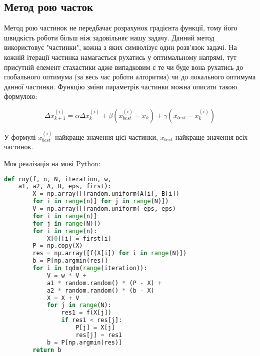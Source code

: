 \subsection{Метод рою часток}


Метод рою частинок не передбачає розрахунок градієнта функції, тому його 
швидкість роботи більш ніж задовільняє нашу задачу.
Данний метод використовує "частинки", кожна з яких символізує один
розв'язок задачі. На кожній ітерації частинка намагається рухатись у 
оптимальному напрямі, тут присутній елемент стахастики адже випадковим є те 
чи буде вона рухатись до глобального оптимума (за весь час 
роботи алгоритма) чи до локального оптимума данної частинки. 
Функцію зміни параметрів частинки можна описати такою формулою: 

$$\Delta x_{k + 1}^{(i)} = \alpha \Delta x_k^{(i)} + 
\beta (x_{best}^{(i)} - x_k) + \gamma(x_{best} - x_k^{(i)})$$


У формулі $x_{best}^{(i)}$ найкраще значення цієї частинки, 
$x_{best}$ найкраще значення всіх частинок. 
\cite{martins_engineering_2021}


Моя реалізація на мові Python:

\begin{lstlisting}[style=Cstyle, language=Python]
    def roy(f, n, N, iteration, w, 
    a1, a2, A, B, eps, first):
        X = np.array([[random.uniform(A[i], B[i]) 
        for i in range(n)] for j in range(N)])
        V = np.array([[random.uniform(-eps, eps) 
        for i in range(n)] 
        for j in range(N)])
        for i in range(n):
            X[0][i] = first[i]
        P = np.copy(X)
        res = np.array([f(X[i]) for i in range(N)])
        b = P[np.argmin(res)]
        for i in tqdm(range(iteration)):
            V = w * V + 
            a1 * random.random() * (P - X) + 
            a2 * random.random() * (b - X)
            X = X + V
            for j in range(N):
                res1 = f(X[j])
                if res1 < res[j]:
                    P[j] = X[j]
                    res[j] = res1
            b = P[np.argmin(res)]
        return b
\end{lstlisting}


